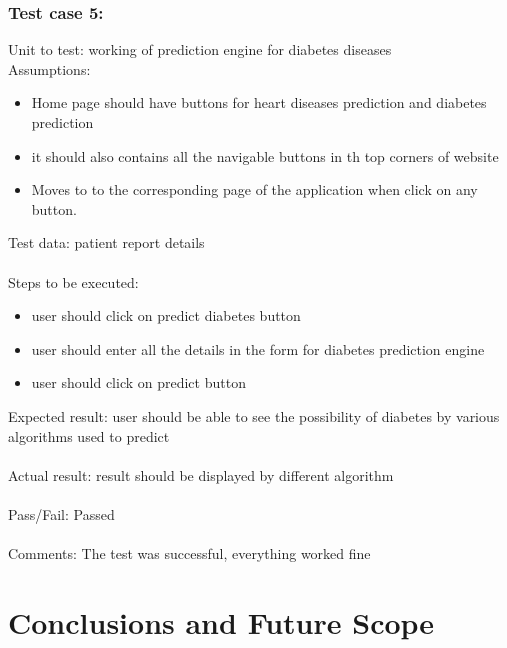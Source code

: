 \documentclass[oneside,12pt]{Classes/VTU}
\begin{document}
	\subsection{Test case 5:}
	Unit to test: working of prediction engine for diabetes diseases \\
	Assumptions:\\
	\begin{itemize}
		\item Home page should have buttons for heart diseases prediction and diabetes prediction
		\item it should also contains all the navigable buttons in th top corners of website
		\item Moves to to the corresponding page of the application when click on any button.
	\end{itemize}
	Test data: patient report details\\
	\\
	Steps to be executed:\\
	\begin{itemize}
		\item user should click on predict diabetes button
		\item user should enter all the details in the form for diabetes prediction engine
		\item user should click on predict button
	\end{itemize}
	Expected result:  user should be able to see the possibility of diabetes by various algorithms used to predict\\
	\\
	Actual result: result should be displayed by different algorithm\\
	\\
	Pass/Fail: Passed\\
	\\
	Comments: The test was successful, everything worked fine
	
	
	\def\baselinestretch{1}
	\chapter{Conclusions and Future Scope}
	\def\baselinestretch{1.66}
\end{document}
